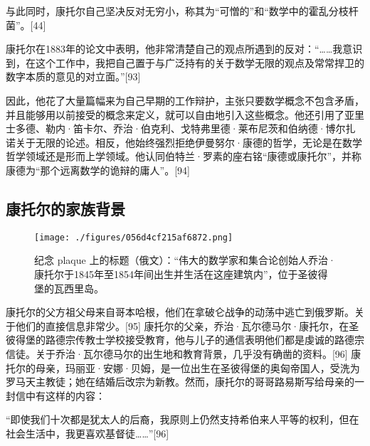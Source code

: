 与此同时，康托尔自己坚决反对无穷小，称其为“可憎的”和“数学中的霍乱分枝杆菌”。[44]

康托尔在1883年的论文中表明，他非常清楚自己的观点所遇到的反对：“……我意识到，在这个工作中，我把自己置于与广泛持有的关于数学无限的观点及常常捍卫的数字本质的意见的对立面。”[93]

因此，他花了大量篇幅来为自己早期的工作辩护，主张只要数学概念不包含矛盾，并且能够用以前接受的概念来定义，就可以自由地引入这些概念。他还引用了亚里士多德、勒内·笛卡尔、乔治·伯克利、戈特弗里德·莱布尼茨和伯纳德·博尔扎诺关于无限的论述。相反，他始终强烈拒绝伊曼努尔·康德的哲学，无论是在数学哲学领域还是形而上学领域。他认同伯特兰·罗素的座右铭“康德或康托尔”，并称康德为“那个远离数学的诡辩的庸人”。[94]
\subsection{康托尔的家族背景}
\begin{figure}[ht]
\centering
\texttt{[image: ./figures/056d4cf215af6872.png]}
\caption{纪念 plaque 上的标题（俄文）：“伟大的数学家和集合论创始人乔治·康托尔于1845年至1854年间出生并生活在这座建筑内”，位于圣彼得堡的瓦西里岛。} \label{fig_Canto_6}
\end{figure}
康托尔的父方祖父母来自哥本哈根，他们在拿破仑战争的动荡中逃亡到俄罗斯。关于他们的直接信息非常少。[95] 康托尔的父亲，乔治·瓦尔德马尔·康托尔，在圣彼得堡的路德宗传教士学校接受教育，他与儿子的通信表明他们都是虔诚的路德宗信徒。关于乔治·瓦尔德马尔的出生地和教育背景，几乎没有确凿的资料。[96] 康托尔的母亲，玛丽亚·安娜·贝姆，是一位出生在圣彼得堡的奥匈帝国人，受洗为罗马天主教徒；她在结婚后改宗为新教。然而，康托尔的哥哥路易斯写给母亲的一封信中有这样的内容：

“即使我们十次都是犹太人的后裔，我原则上仍然支持希伯来人平等的权利，但在社会生活中，我更喜欢基督徒……”[96]

